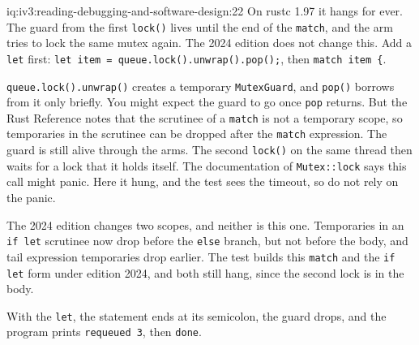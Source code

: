\begin{solution}{iq:iv3:reading-debugging-and-software-design:22}
On rustc 1.97 it hangs for ever. The guard from the first \texttt{lock()} lives until the end of the \texttt{match}, and the arm tries to lock the same mutex again. The 2024 edition does not change this. Add a \texttt{let} first: \texttt{let item = queue.lock().unwrap().pop();}, then \texttt{match item \{}.

\texttt{queue.lock().unwrap()} creates a temporary \texttt{MutexGuard}, and \texttt{pop()} borrows from it only briefly. You might expect the guard to go once \texttt{pop} returns. But the Rust Reference notes that the scrutinee of a \texttt{match} is not a temporary scope, so temporaries in the scrutinee can be dropped after the \texttt{match} expression. The guard is still alive through the arms. The second \texttt{lock()} on the same thread then waits for a lock that it holds itself. The documentation of \texttt{Mutex::lock} says this call might panic. Here it hung, and the test sees the timeout, so do not rely on the panic.

The 2024 edition changes two scopes, and neither is this one. Temporaries in an \texttt{if let} scrutinee now drop before the \texttt{else} branch, but not before the body, and tail expression temporaries drop earlier. The test builds this \texttt{match} and the \texttt{if let} form under edition 2024, and both still hang, since the second lock is in the body.

With the \texttt{let}, the statement ends at its semicolon, the guard drops, and the program prints \texttt{requeued 3}, then \texttt{done}.


\end{solution}

